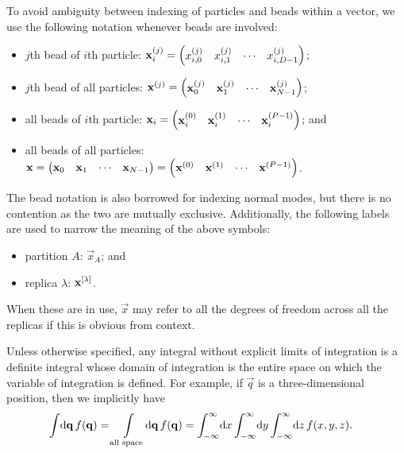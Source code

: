 To avoid ambiguity between indexing of particles and beads within a vector, we use the following notation whenever beads are involved:
\begin{itemize}
	\item $j$th bead of $i$th particle: $\bm{\mathbf{x}}_i^{(j)} = \begin{pmatrix} x_{i,0}^{(j)} & x_{i,1}^{(j)} & \cdots & x_{i,D-1}^{(j)} \end{pmatrix}$;
	\item $j$th bead of all particles: $\bm{\mathbf{x}}^{(j)} = \begin{pmatrix} \bm{\mathbf{x}}_0^{(j)} & \bm{\mathbf{x}}_1^{(j)} & \cdots & \bm{\mathbf{x}}_{N-1}^{(j)} \end{pmatrix}$;
	\item all beads of $i$th particle: $\bm{\mathbf{x}}_i = \begin{pmatrix} \bm{\mathbf{x}}_i^{(0)} & \bm{\mathbf{x}}_i^{(1)} & \cdots & \bm{\mathbf{x}}_i^{(P-1)} \end{pmatrix}$; and
	\item all beads of all particles: $\bm{\mathbf{x}} = \begin{pmatrix} \bm{\mathbf{x}}_0 & \bm{\mathbf{x}}_1 & \cdots & \bm{\mathbf{x}}_{N-1} \end{pmatrix} = \begin{pmatrix} \bm{\mathbf{x}}^{(0)} & \bm{\mathbf{x}}^{(1)} & \cdots & \bm{\mathbf{x}}^{(P-1)} \end{pmatrix}$.
\end{itemize}
The bead notation is also borrowed for indexing normal modes, but there is no contention as the two are mutually exclusive.
Additionally, the following labels are used to narrow the meaning of the above symbols:
\begin{itemize}
	\item partition $A$: $\vec{x}_A$; and
	\item replica $\lambda$: $\bm{\mathbf{x}}^{[\lambda]}$.
\end{itemize}
When these are in use, $\vec{x}$ may refer to all the degrees of freedom across all the replicas if this is obvious from context.

Unless otherwise specified, any integral without explicit limits of integration is a definite integral whose domain of integration is the entire space on which the variable of integration is defined.
For example, if $\vec{q}$ is a three-dimensional position, then we implicitly have
\begin{align}
	\int\! \dif \vec{q} \, f(\vec{q})
	&= \int\limits_\text{all space}\! \dif \vec{q} \, f(\vec{q})
	= \int_{-\infty}^\infty\! \dif x \int_{-\infty}^\infty\! \dif y \int_{-\infty}^\infty\! \dif z \, f(x, y, z).
\end{align}

